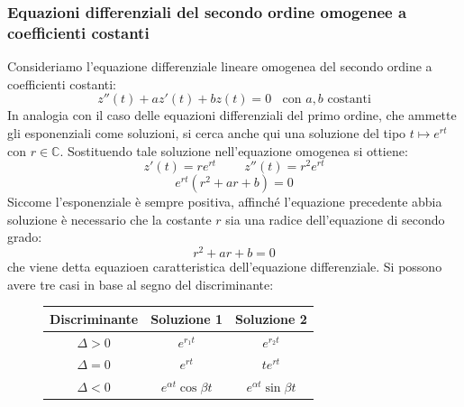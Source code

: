\documentclass[a4paper]{article}
\numberwithin{equation}{subsection}
\begin{document}
\subsubsection{Equazioni differenziali del secondo ordine omogenee a coefficienti costanti}

Consideriamo l'equazione differenziale lineare omogenea del secondo ordine a coefficienti costanti:
\[z''(t) + az'(t) + bz(t) = 0 \; \; \text{ con $a, b$ costanti}\]
In analogia con il caso delle equazioni differenziali del primo ordine, che ammette gli esponenziali come soluzioni, si cerca
anche qui una soluzione del tipo $t \mapsto e^{rt}$ con $r \in \mathbb{C}$. Sostituendo tale soluzione nell'equazione omogenea si ottiene:
\[z'(t) = re^{rt} \; \; \; \; \; \; \; \; z''(t) = r^2e^{rt}\]
\[e^{rt}(r^2 + ar + b) = 0\]
Siccome l'esponenziale è sempre positiva, affinché l'equazione precedente abbia soluzione
è necessario che la costante $r$ sia una radice dell'equazione di secondo grado:
\[r^2 + ar + b = 0\]
che viene detta equazioen caratteristica dell'equazione differenziale. Si possono avere tre casi in base al segno del discriminante:

\begin{figure}[H]
\centering
\begin{tabular}{|c|c|c|}
    \hline
    Discriminante & Soluzione 1 & Soluzione 2\\
    \hline
    $\Delta > 0$ & $e^{r_1t}$ & $e^{r_2t}$\\
    $\Delta = 0$ & $e^{rt}$ & $te^{rt}$\\
    $\Delta < 0$ & $e^{\alpha t}\cos{\beta t}$ & $e^{\alpha t}\sin{\beta t}$ \\
    \hline
\end{tabular}
\end{figure}
\end{document}
